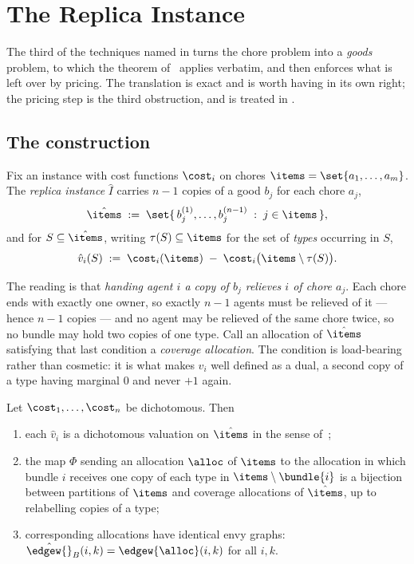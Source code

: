 
\section{The Replica Instance}
\label{sec:replica}

The third of the techniques named in  turns the chore
problem into a \emph{goods} problem, to which the theorem of~\cite{BKNS22}
applies verbatim, and then enforces what is left over by pricing. The translation
is exact and is worth having in its own right; the pricing step is the third
obstruction, and is treated in .

\subsection{The construction}
\label{sec:main-replica}

Fix an instance with cost functions $\cost_i$ on chores
$\items = \set{a_1,\dots,a_m}$. The \emph{replica instance} $\hat{I}$ carries
$n-1$ copies of a good $b_j$ for each chore $a_j$,
\[
  \hat{\items} \;:=\; \set{\, b_j^{(1)}, \dots, b_j^{(n-1)} \;:\; j \in \items \,},
\]
and for $S \subseteq \hat{\items}$, writing $\tau(S) \subseteq \items$ for the
set of \emph{types} occurring in $S$,
\[
  \hat{v}_i(S) \;:=\; \cost_i(\items) \;-\; \cost_i\big(\items \setminus \tau(S)\big).
\]

The reading is that \emph{handing agent $i$ a copy of $b_j$ relieves $i$ of chore
$a_j$}. Each chore ends with exactly one owner, so exactly $n-1$ agents must be
relieved of it --- hence $n-1$ copies --- and no agent may be relieved of the
same chore twice, so no bundle may hold two copies of one type. Call an
allocation of $\hat{\items}$ satisfying that last condition a \emph{coverage
allocation}. The condition is load-bearing rather than cosmetic: it is what makes
$\hat{v}_i$ well defined as a dual, a second copy of a type having marginal $0$
and never $+1$ again.

\begin{theorem}
\label{main:replica}
Let $\cost_1,\dots,\cost_n$ be dichotomous. Then
\begin{enumerate}
  \item[(i)] each $\hat{v}_i$ is a dichotomous valuation on $\hat{\items}$ in the
    sense of~\cite{BKNS22};
  \item[(ii)] the map $\Phi$ sending an allocation $\alloc$ of $\items$ to the
    allocation in which bundle $i$ receives one copy of each type in
    $\items \setminus \bundle{i}$ is a bijection between partitions of $\items$
    and coverage allocations of $\hat{\items}$, up to relabelling copies of a
    type;
  \item[(iii)] corresponding allocations have identical envy graphs:
    $\hat{\edgew{}}_{B}(i,k) = \edgew{\alloc}(i,k)$ for all $i,k$.
\end{enumerate}
\end{theorem}


